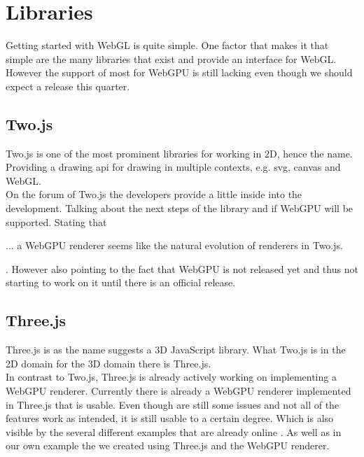 %
%
% 
% 

\chapter{Libraries}

\label{chap:Libraries}

Getting started with WebGL is quite simple. 
One factor that makes it that simple are the many libraries that exist and provide an interface for WebGL.
However the support of most for WebGPU is still lacking even though we should expect a release this quarter.

\section{Two.js}

Two.js is one of the most prominent libraries for working in 2D, hence the name.
Providing a drawing api for drawing in multiple contexts, e.g. svg, canvas and WebGL.\\
On the forum of Two.js the developers provide a little inside into the development.
Talking about the next steps of the library and if WebGPU will be supported.
Stating that \begin{displayquote} ... a WebGPU renderer seems like the natural evolution of renderers in Two.js. \end{displayquote}\cite{two_quote}.
However also pointing to the fact that WebGPU is not released yet and thus not starting to work on it until there is an official release.

\section{Three.js}

Three.js is as the name suggests a 3D JavaScript library. 
What Two.js is in the 2D domain for the 3D domain there is Three.js.\\
In contrast to Two.js, Three.js is already actively working on implementing a WebGPU renderer.
Currently there is already a WebGPU renderer implemented in Three.js that is usable. 
Even though are still some issues and not all of the features work as intended, it is still usable to a certain degree.
Which is also visible by the several different examples that are already online \cite{three_examples}.
As well as in our own example the we created using Three.js and the WebGPU renderer.

